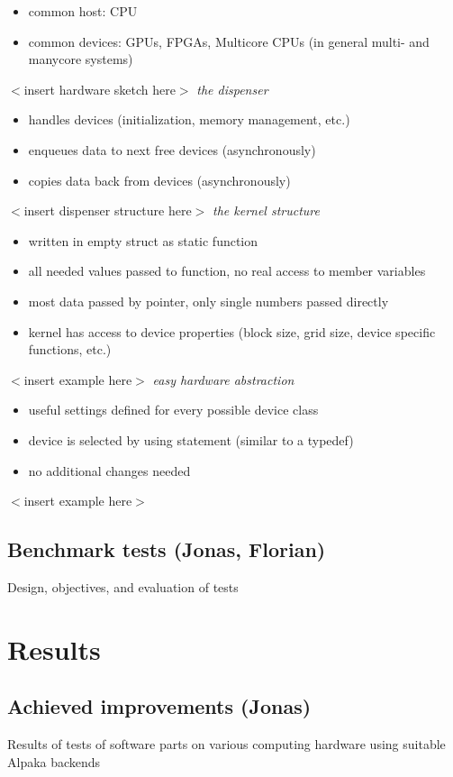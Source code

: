 \documentclass[a4paper]{article}
\begin{document}
{\begin{itemize}
	\item common host: CPU
	\item common devices: GPUs, FPGAs, Multicore CPUs (in general multi- and manycore systems)
\end{itemize}
$<$insert hardware sketch here$>$
\textit{the dispenser}
\begin{itemize}
	\item handles devices (initialization, memory management, etc.)
	\item enqueues data to next free devices (asynchronously)
	\item copies data back from devices (asynchronously)
\end{itemize}
$<$insert dispenser structure here$>$
\textit{the kernel structure}
\begin{itemize}
	\item written in empty struct as static function
	\item all needed values passed to function, no real access to member variables
	\item most data passed by pointer, only single numbers passed directly
	\item kernel has access to device properties (block size, grid size, device specific functions, etc.)
\end{itemize}
$<$insert example here$>$
\textit{easy hardware abstraction}
\begin{itemize}
	\item useful settings defined for every possible device class
	\item device is selected by using statement (similar to a typedef)
	\item no additional changes needed
\end{itemize}
$<$insert example here$>$
}


\subsection{Benchmark tests (Jonas, Florian)}
\label{subsec:benchmark}
Design, objectives, and evaluation of tests

\section{Results}
\label{sec:results}
\subsection{Achieved improvements (Jonas)}
Results of tests of software parts on various computing hardware using suitable Alpaka backends\\
\end{document}
